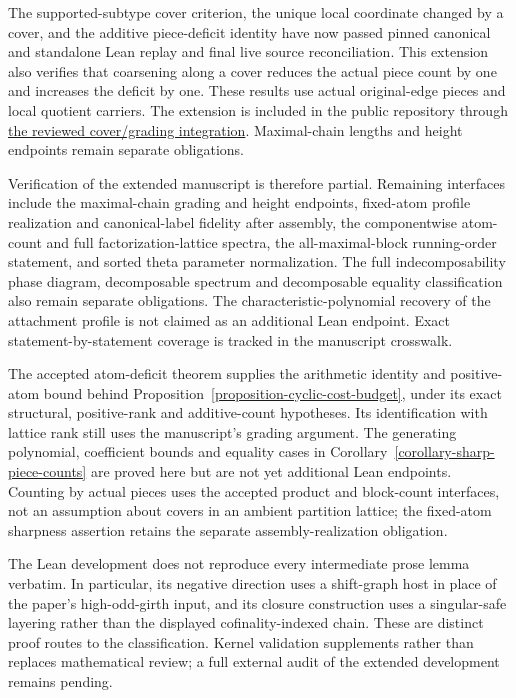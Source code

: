 \documentclass[a4paper,11pt,reqno]{amsart}
\theoremstyle{plain}
\theoremstyle{definition}
\theoremstyle{remark}
\begin{document}
The supported-subtype cover criterion, the unique local coordinate changed by
a cover, and the additive piece-deficit identity have now passed pinned
canonical and standalone Lean replay and final live source reconciliation.
This extension also verifies that coarsening along a cover reduces the actual
piece count by one and increases the deficit by one. These results use actual
original-edge pieces and local quotient carriers. The extension is included
in the public repository through
\href{https://github.com/SamPetkov/Erdos593/pull/51}{the reviewed cover/grading
integration}. Maximal-chain lengths and height endpoints
remain separate obligations.

Verification of the extended manuscript is therefore partial.  Remaining
interfaces include the maximal-chain grading and height endpoints, fixed-atom
profile realization and
canonical-label fidelity after assembly, the componentwise atom-count and full factorization-lattice
spectra, the all-maximal-block running-order statement, and sorted theta
parameter normalization.  The full indecomposability phase diagram,
decomposable spectrum and decomposable equality classification also remain
separate obligations.  The characteristic-polynomial recovery of the
attachment profile is not claimed as an additional Lean endpoint.  Exact
statement-by-statement coverage is tracked in the manuscript crosswalk.

The accepted atom-deficit theorem supplies the arithmetic identity and
positive-atom bound behind
Proposition~\ref{proposition-cyclic-cost-budget}, under its exact structural,
positive-rank and additive-count hypotheses.  Its identification with lattice
rank still uses the manuscript's grading argument.  The generating polynomial,
coefficient bounds and equality cases in
Corollary~\ref{corollary-sharp-piece-counts} are proved here but are not yet
additional Lean endpoints.  Counting by actual pieces uses the accepted
product and block-count interfaces, not an assumption about covers in an
ambient partition lattice; the fixed-atom sharpness assertion retains the
separate assembly-realization obligation.

The Lean development does not reproduce every intermediate prose lemma
verbatim.  In particular, its negative direction uses a shift-graph host in
place of the paper's high-odd-girth input, and its closure construction uses
a singular-safe layering rather than the displayed cofinality-indexed chain.
These are distinct proof routes to the classification.  Kernel validation
supplements rather than replaces mathematical review; a full external audit
of the extended development remains pending.
\end{document}
